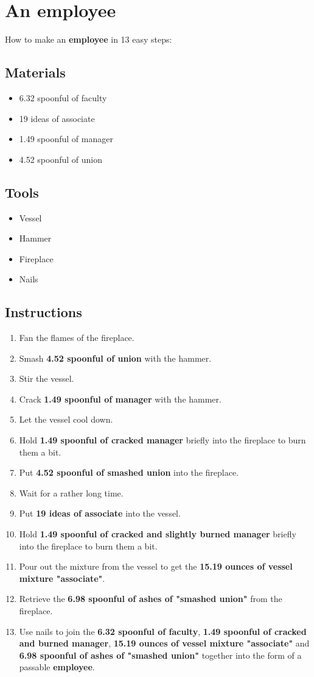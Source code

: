 \documentclass{article}
\begin{document}
\section{An employee}How to make an \textbf{employee} in 13 easy steps:

\subsection{Materials}\begin{itemize}
\item 
6.32 spoonful of faculty
\item 
19 ideas of associate
\item 
1.49 spoonful of manager
\item 
4.52 spoonful of union
\end{itemize}
\subsection{Tools}\begin{itemize}
\item 
Vessel
\item 
Hammer
\item 
Fireplace
\item 
Nails
\end{itemize}
\subsection{Instructions}\begin{enumerate}
\item 
Fan the flames of the fireplace.
\item 
Smash \textbf{4.52 spoonful of union} with the hammer.
\item 
Stir the vessel.
\item 
Crack \textbf{1.49 spoonful of manager} with the hammer.
\item 
Let the vessel cool down.
\item 
Hold \textbf{1.49 spoonful of cracked manager} briefly into the fireplace to burn them a bit.
\item 
Put \textbf{4.52 spoonful of smashed union} into the fireplace.
\item 
Wait for a rather long time.
\item 
Put \textbf{19 ideas of associate} into the vessel.
\item 
Hold \textbf{1.49 spoonful of cracked and slightly burned manager} briefly into the fireplace to burn them a bit.
\item 
Pour out the mixture from the vessel to get the \textbf{15.19 ounces of vessel mixture "associate"}.
\item 
Retrieve the \textbf{6.98 spoonful of ashes of "smashed union"} from the fireplace.
\item 
Use nails to join the \textbf{6.32 spoonful of faculty}, \textbf{1.49 spoonful of cracked and burned manager}, \textbf{15.19 ounces of vessel mixture "associate"} and \textbf{6.98 spoonful of ashes of "smashed union"} together into the form of a passable \textbf{employee}.
\end{enumerate}
\newpage
\end{document}
